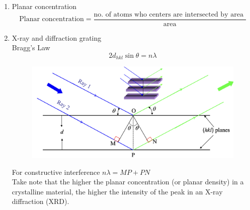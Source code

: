\begin{enumerate}
    \item Planar concentration 
    \[\text{Planar concentration} = \frac{\text{no. of atoms who centers are intersected by area }}{\text{area}}\]
    \newpage
    \item X-ray and diffraction grating \\
    Bragg's Law
    \begin{equation}
        2d_{hkl}\sin \theta= n\lambda
    \end{equation}
    \begin{figure}[h]
        \centering
        \includegraphics[width=0.75\linewidth]{image/bragglaw.png}
    \end{figure}
    For constructive interference $\displaystyle n\lambda = MP + PN$ \\
    Take note that  the higher the planar concentration (or planar density) in a crystalline material, the higher the intensity of the peak in an X-ray diffraction (XRD).
    
\end{enumerate}
